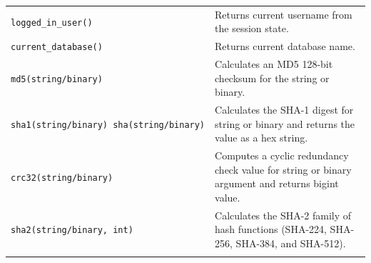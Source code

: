 \documentclass[
]{article}
\begin{document}
\begin{longtable}[]{@{}ll@{}}
\begin{minipage}[t]{0.39\columnwidth}\raggedright
\texttt{logged\_in\_user()}\strut
\end{minipage} & \begin{minipage}[t]{0.55\columnwidth}\raggedright
Returns current username from the session state.\strut
\end{minipage}\tabularnewline
\begin{minipage}[t]{0.39\columnwidth}\raggedright
\texttt{current\_database()}\strut
\end{minipage} & \begin{minipage}[t]{0.55\columnwidth}\raggedright
Returns current database name.\strut
\end{minipage}\tabularnewline
\begin{minipage}[t]{0.39\columnwidth}\raggedright
\texttt{md5(string/binary)}\strut
\end{minipage} & \begin{minipage}[t]{0.55\columnwidth}\raggedright
Calculates an MD5 128-bit checksum for the string or binary.\strut
\end{minipage}\tabularnewline
\begin{minipage}[t]{0.39\columnwidth}\raggedright
\texttt{sha1(string/binary)\ sha(string/binary)}\strut
\end{minipage} & \begin{minipage}[t]{0.55\columnwidth}\raggedright
Calculates the SHA-1 digest for string or binary and returns the value
as a hex string.\strut
\end{minipage}\tabularnewline
\begin{minipage}[t]{0.39\columnwidth}\raggedright
\texttt{crc32(string/binary)}\strut
\end{minipage} & \begin{minipage}[t]{0.55\columnwidth}\raggedright
Computes a cyclic redundancy check value for string or binary argument
and returns bigint value.\strut
\end{minipage}\tabularnewline
\begin{minipage}[t]{0.39\columnwidth}\raggedright
\texttt{sha2(string/binary,\ int)}\strut
\end{minipage} & \begin{minipage}[t]{0.55\columnwidth}\raggedright
Calculates the SHA-2 family of hash functions (SHA-224, SHA-256,
SHA-384, and SHA-512).\strut
\end{minipage}\tabularnewline
\begin{minipage}[t]{0.39\columnwidth}\raggedright

\end{minipage}
\end{longtable}
\end{document}
